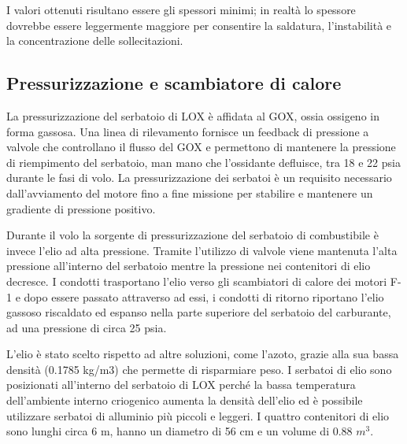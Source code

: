 I valori ottenuti risultano essere gli spessori minimi; in realtà lo spessore dovrebbe essere leggermente maggiore per consentire la saldatura, l'instabilità e la concentrazione delle sollecitazioni. 

\subsection{Pressurizzazione e scambiatore di calore}
\label{subsec:pressurizzazione_e_scambiatore_di_calore}

La pressurizzazione del serbatoio di LOX è affidata al GOX, ossia ossigeno in forma gassosa. Una linea di rilevamento fornisce un feedback di pressione a valvole che controllano il flusso del GOX e permettono di mantenere la pressione di riempimento del serbatoio, man mano che l’ossidante defluisce, tra 18 e 22 psia durante le fasi di volo. La pressurizzazione dei serbatoi è un requisito necessario dall’avviamento del motore fino a fine missione per stabilire e mantenere un gradiente di pressione positivo.

Durante il volo la sorgente di pressurizzazione del serbatoio di combustibile è invece l’elio ad alta pressione. Tramite l’utilizzo di valvole viene mantenuta l’alta pressione all’interno del serbatoio mentre la pressione nei contenitori di elio decresce. 
I condotti trasportano l’elio verso gli scambiatori di calore dei motori F-1 e dopo essere passato attraverso ad essi, i condotti di ritorno riportano l’elio gassoso riscaldato ed espanso nella parte superiore del serbatoio del carburante, ad una pressione di circa 25 psia.

L’elio è stato scelto rispetto ad altre soluzioni, come l’azoto, grazie alla sua bassa densità (0.1785 kg/m3) che permette di risparmiare peso.
I serbatoi di elio sono posizionati all’interno del serbatoio di LOX perché la bassa temperatura dell’ambiente interno criogenico aumenta la densità dell’elio ed è possibile utilizzare serbatoi di alluminio più piccoli e leggeri.
I quattro contenitori di elio sono lunghi circa 6 m, hanno un diametro di 56 cm e un volume di 0.88 $m^3$.

